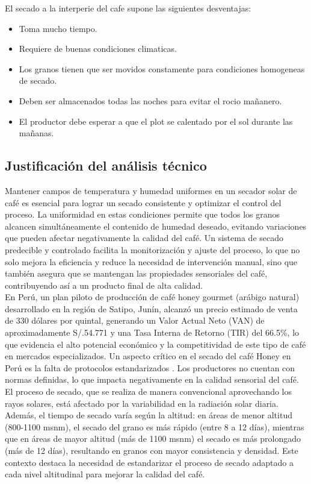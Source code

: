 \documentclass[12pt]{article}
\begin{document}
El secado a la interperie del cafe supone las siguientes desventajas:

\begin{itemize}
    \item Toma mucho tiempo.
    \item Requiere de buenas condiciones climaticas.
    \item Los granos tienen que ser movidos constamente para condiciones homogeneas de secado. 
    \item Deben ser almacenados todas las noches para evitar el rocio mañanero. 
    \item El productor debe esperar a que el plot se calentado por el sol durante las mañanas. 
\end{itemize}


\subsection{Justificación del análisis técnico}

Mantener campos de temperatura y humedad uniformes en un secador solar de café es esencial para lograr un secado consistente y optimizar el control del proceso. La uniformidad en estas condiciones permite que todos los granos alcancen simultáneamente el contenido de humedad deseado, evitando variaciones que pueden afectar negativamente la calidad del café. Un sistema de secado predecible y controlado facilita la monitorización y ajuste del proceso, lo que no solo mejora la eficiencia y reduce la necesidad de intervención manual, sino que también asegura que se mantengan las propiedades sensoriales del café, contribuyendo así a un producto final de alta calidad.\\


En Perú, un plan piloto de producción de café honey gourmet (arábigo natural) desarrollado en la región de Satipo, Junín, alcanzó un precio estimado de venta de 330 dólares por quintal, generando un Valor Actual Neto (VAN) de aproximadamente S/.54.771 y una Tasa Interna de Retorno (TIR) del 66.5\%, lo que evidencia el alto potencial económico y la competitividad de este tipo de café en mercados especializados. Un aspecto crítico en el secado del café Honey en Perú es la falta de protocolos estandarizados  \cite{Alomia2021}. Los productores no cuentan con normas definidas, lo que impacta negativamente en la calidad sensorial del café. El proceso de secado, que se realiza de manera convencional aprovechando los rayos solares, está afectado por la variabilidad en la radiación solar diaria. Además, el tiempo de secado varía según la altitud: en áreas de menor altitud (800-1100 msnm), el secado del grano es más rápido (entre 8 a 12 días), mientras que en áreas de mayor altitud (más de 1100 msnm) el secado es más prolongado (más de 12 días), resultando en granos con mayor consistencia y densidad. Este contexto destaca la necesidad de estandarizar el proceso de secado adaptado a cada nivel altitudinal para mejorar la calidad del café.\\
\end{document}
